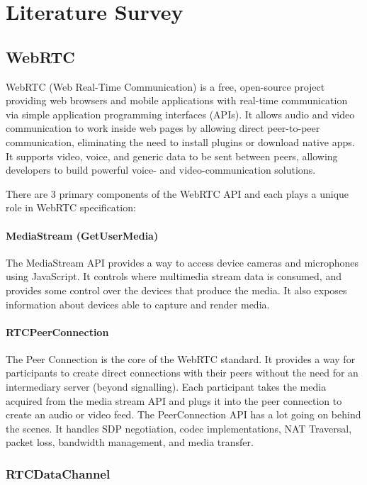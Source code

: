\chapter{Literature Survey}

\section{WebRTC}

WebRTC (Web Real-Time Communication) is a free, open-source project providing web browsers and 
mobile applications with real-time communication via simple application programming interfaces (APIs). 
It allows audio and video communication to work inside web pages by allowing direct peer-to-peer 
communication, eliminating the need to install plugins or download native apps.
It supports video, voice, and generic data to be sent between peers, allowing developers 
to build powerful voice- and video-communication solutions.~\cite{wikiWebRTC}

There are 3 primary components of the WebRTC API and each plays a unique role in WebRTC specification:

\subsubsection{MediaStream (GetUserMedia)}

The MediaStream API provides a way to access device cameras and microphones using JavaScript. 
It controls where multimedia stream data is consumed, and provides some control over the devices 
that produce the media. It also exposes information about devices able to capture and render media.

\subsubsection{RTCPeerConnection}

The Peer Connection is the core of the WebRTC standard. It provides a way for participants to 
create direct connections with their peers without the need for an intermediary 
server (beyond signalling). Each participant takes the media acquired from the media 
stream API and plugs it into the peer connection to create an audio or video feed.  
The PeerConnection API has a lot going on behind the scenes. It handles SDP negotiation, 
codec implementations, NAT Traversal, packet loss, bandwidth management, and media transfer.

\subsection{RTCDataChannel}

